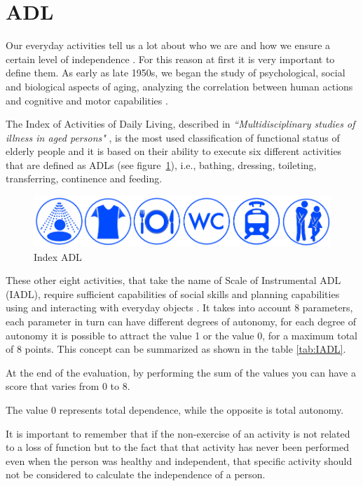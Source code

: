 \documentclass{thesisreport}
\begin{document}
\section{ADL}
Our everyday activities tell us a lot about who we are and how we ensure a certain level of independence \cite{buoncompagni2017towards}. For this reason at first it is very important to define them. As early as late 1950s, we began the study of psychological, social and biological aspects of aging, analyzing the correlation between human actions and cognitive and motor capabilities \cite{buoncompagni2017towards}. 

The Index of Activities of Daily Living, described in \textit{``Multidisciplinary studies of illness in aged persons"} \cite{Multidisciplinary},  is the most used classification of functional status of elderly people and it is based on their ability to execute six different activities that are defined as ADLs (see figure~\ref{fig:indexADL}), i.e., bathing, dressing, toileting, transferring, continence and feeding.

\begin{figure}[H]
	\centering
	\includegraphics[width=17cm]{Thesis/data/IndexADL.png}
	\caption{Index ADL}
	\label{fig:indexADL}
\end{figure}

 These other eight activities, that take the name of Scale of Instrumental ADL \cite{lawton1970assessment} (IADL), require sufficient capabilities of social skills and planning capabilities using and interacting with everyday objects \cite{buoncompagni2017towards}. 
It takes into account 8 parameters, each parameter in turn can have different degrees of autonomy, for each degree of autonomy it is possible to attract the value 1 or the value 0, for a maximum total of 8 points. This concept can be summarized as shown in the table \ref{tab:IADL}. 



At the end of the evaluation, by performing the sum of the values you can have a score that varies from 0 to 8.

The value 0 represents total dependence, while the opposite is total autonomy.

It is important to remember that if the non-exercise of an activity is not related to a loss of function but to the fact that that activity has never been performed even when the person was healthy and independent, that specific activity should not be considered to calculate the independence of a person.
\end{document}
